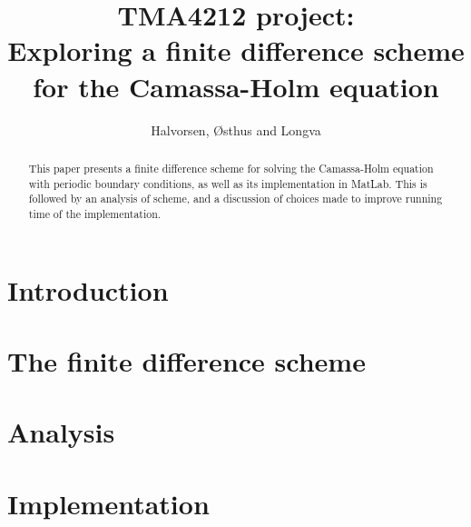 \documentclass{article}
\title{TMA4212 project: \\ Exploring a finite difference scheme for the Camassa-Holm equation}
\author{Halvorsen, Østhus and Longva}
\begin{document}
\maketitle

\begin{abstract}
This paper presents a finite difference scheme for solving the Camassa-Holm equation with periodic boundary conditions, as well as its implementation in MatLab. This is followed by an analysis of scheme, and a discussion of choices made to improve running time of the implementation. 
\end{abstract}

\newpage

\section*{Introduction}


\newpage

\section*{The finite difference scheme}



%

\newpage

\section*{Analysis}



\section*{Implementation}



{}

\end{document}
